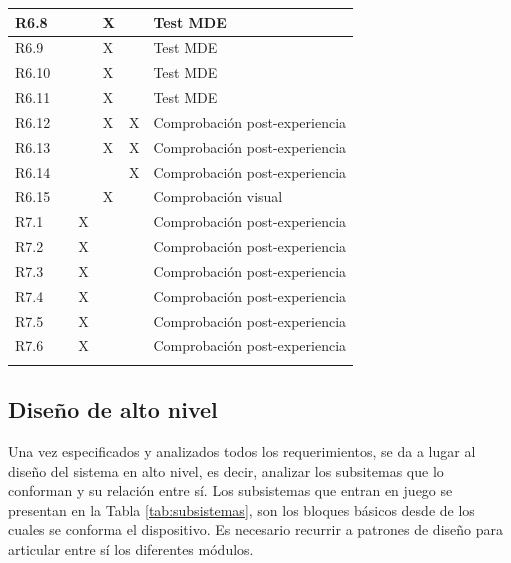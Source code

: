 \begin{longtable}[c]{llllll}
R6.8 &  &  & X &  & Test MDE \\ \hline
R6.9 &  &  & X &  & Test MDE \\ \hline
R6.10 &  &  & X &  & Test MDE \\ \hline
R6.11 &  &  & X &  & Test MDE \\ \hline
R6.12 &  &  & X & X & Comprobación post-experiencia \\ \hline
R6.13 &  &  & X & X & Comprobación post-experiencia \\ \hline
R6.14 &  &  &  & X & Comprobación post-experiencia \\ \hline
R6.15 &  &  & X &  & Comprobación visual \\ \hline
R7.1 &  & X &  &  & Comprobación post-experiencia \\ \hline
R7.2 &  & X &  &  & Comprobación post-experiencia \\ \hline
R7.3 &  & X &  &  & Comprobación post-experiencia \\ \hline
R7.4 &  & X &  &  & Comprobación post-experiencia \\ \hline
R7.5 &  & X &  &  & Comprobación post-experiencia \\ \hline
R7.6 &  & X &  &  & Comprobación post-experiencia \\ \hline
\label{tab:matrizTrazabilidad}\\
\end{longtable}

\normalsize


\subsection{Diseño de alto nivel} \label{disAltoNivel}

Una vez especificados y analizados todos los requerimientos, se da a lugar al diseño del sistema en alto nivel, es decir, analizar los subsitemas que lo conforman y su relación entre sí. Los subsistemas que entran en juego se presentan en la Tabla \ref{tab:subsistemas}, son los bloques básicos desde de los cuales se conforma el dispositivo. Es necesario recurrir a patrones de diseño \citep{douglass2011} para articular entre sí los diferentes módulos.

